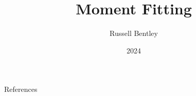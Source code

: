 \documentclass{beamer}
\title{Moment Fitting}
\subtitle{}
\author{Russell Bentley}
\institute{Stony Brook}
\date{2024}
\begin{document}
\frame{\titlepage}



\begin{frame}[allowframebreaks]{References}
    \tiny
    \printbibliography
\end{frame}
\end{document}
